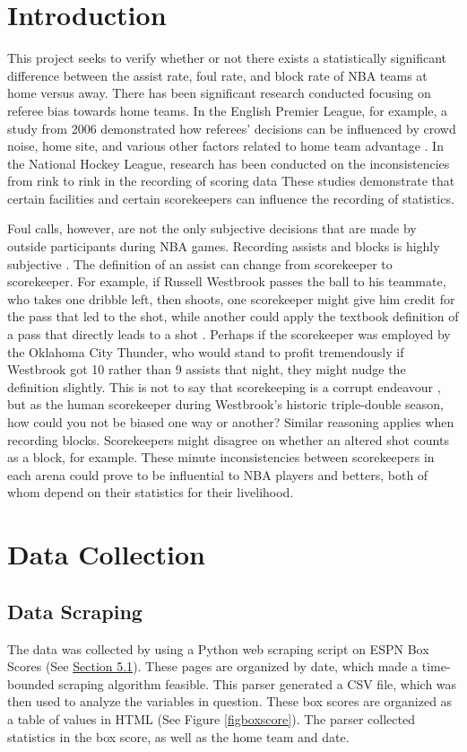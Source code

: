 \documentclass{article}
\begin{document}
\section{Introduction}
This project seeks to verify whether or not there exists a statistically significant difference between the assist rate, foul rate, and block rate of NBA teams at home versus away. There has been significant research conducted focusing on referee bias towards home teams. In the English Premier League, for example, a study from 2006 demonstrated how referees' decisions can be influenced by crowd noise, home site, and various other factors related to home team advantage \cite{doi:10.1080/02640410601038576}. In the National Hockey League, research has been conducted on the inconsistencies from rink to rink in the recording of scoring data \cite{2014arXiv1412.1035S} These studies demonstrate that certain facilities and certain scorekeepers can influence the recording of statistics.
\par Foul calls, however, are not the only subjective decisions that are made by outside participants during NBA games. Recording assists and blocks is highly subjective \cite{moore_2015}. The definition of an assist can change from scorekeeper to scorekeeper. For example, if Russell Westbrook passes the ball to his teammate, who takes one dribble left, then shoots, one scorekeeper might give him credit for the pass that led to the shot, while another could apply the textbook definition of a pass that directly leads to a shot \cite{lund_2018}. Perhaps if the scorekeeper was employed by the Oklahoma City Thunder, who would stand to profit tremendously if Westbrook got 10 rather than 9 assists that night, they might nudge the definition slightly. This is not to say that scorekeeping is a corrupt endeavour \cite{craggs_2018}, but as the human scorekeeper during Westbrook's historic triple-double season, how could you not be biased one way or another? Similar reasoning applies when recording blocks. Scorekeepers might disagree on whether an altered shot counts as a block, for example. These minute inconsistencies between scorekeepers in each arena could prove to be influential to NBA players and betters, both of whom depend on their statistics for their livelihood.
    
\section{Data Collection}

\subsection{Data Scraping}
 The data was collected by using a Python web scraping script on ESPN Box Scores (See \hyperlink{htmlcode}{Section 5.1}). These pages are organized by date, which made a time-bounded scraping algorithm feasible. This parser generated a CSV file, which was then used to analyze the variables in question. These box scores are organized as a table of values in HTML (See Figure \ref{figboxscore}). The parser collected statistics in the box score, as well as the home team and date.
\end{document}
